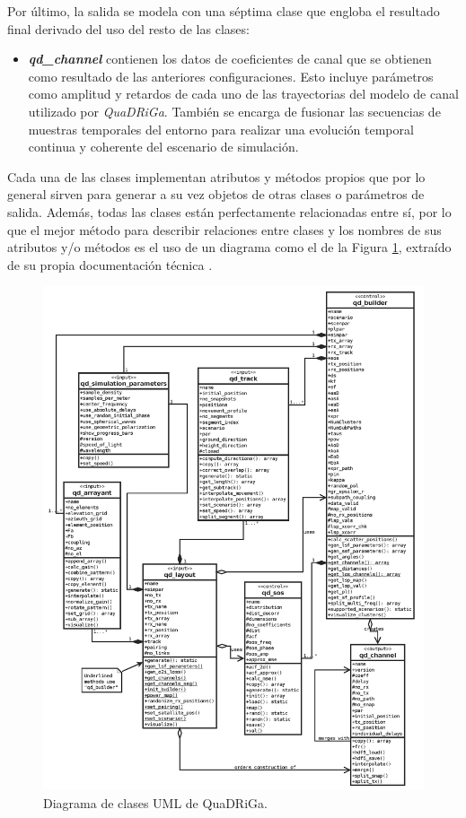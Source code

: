 Por último, la salida se modela con una séptima clase que engloba el resultado final derivado del uso del resto de las clases:

\begin{itemize}
    \item \textbf{\textit{qd\_channel}} contienen los datos de coeficientes de canal que se obtienen como resultado de las anteriores configuraciones. Esto incluye parámetros como amplitud y retardos de cada uno de las trayectorias del modelo de canal utilizado por \textit{QuaDRiGa}. También se encarga de fusionar las secuencias de muestras temporales del entorno para realizar una evolución temporal continua y coherente del escenario de simulación.
\end{itemize}

Cada una de las clases implementan atributos y métodos propios que por lo general sirven para generar a su vez objetos de otras clases o parámetros de salida. Además, todas las clases están perfectamente relacionadas entre sí, por lo que el mejor método para describir relaciones entre clases y los nombres de sus atributos y/o métodos es el uso de un diagrama como el de la Figura \ref{fig:uml_quadriga}, extraído de su propia documentación técnica \cite{quadrigadoc}.


\begin{figure}[ht!]
	\centering
    \includegraphics[width=\linewidth]{imagenes/uml_quadriga.png}
	\caption{Diagrama de clases UML de QuaDRiGa.}
	\label{fig:uml_quadriga}
\end{figure}

